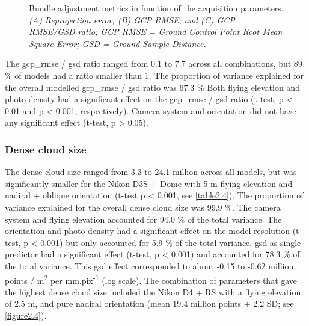 \begin{figure}[ht]
	\caption[Bundle adjustment metrics in function of the acquisition parameters.]{Bundle adjustment metrics in function of the acquisition parameters. \textit{(A) Reprojection error; (B) GCP RMSE; and (C) GCP RMSE/GSD ratio; GCP RMSE = Ground Control Point Root Mean Square Error; GSD = Ground Sample Distance.}}
	\label{figure2.3}
    
\end{figure}

The \acrshort{gcp_rmse} / \acrshort{gsd} ratio ranged from 0.1 to 7.7 across all combinations, but 89 \% of models had a ratio smaller than 1. The proportion of variance explained for the overall modelled \acrshort{gcp_rmse} / \acrshort{gsd} ratio was 67.3 \% Both flying elevation and photo density had a significant effect on the \acrshort{gcp_rmse} / \acrshort{gsd} ratio (t-test, p < 0.01 and p < 0.001, respectively). Camera system and orientation did not have any significant effect (t-test, p > 0.05).
\subsubsection{Dense cloud size}\label{chapitre2_3.1.2}
The dense cloud size ranged from 3.3 to 24.1 million across all models, but was significantly smaller for the Nikon D3S + Dome with 5 m flying elevation and nadiral + oblique orientation (t-test p < 0.001, see \autoref{table2.4}). The proportion of variance explained for the overall dense cloud size was 99.9 \%. The camera system and flying elevation accounted for 94.0 \% of the total variance. The orientation and photo density had a significant effect on the model resolution (t-test, p < 0.001) but only accounted for 5.9 \% of the total variance. \acrshort{gsd} as single predictor had a significant effect (t-test, p < 0.001) and accounted for 78.3 \% of the total variance. This \acrshort{gsd} effect corresponded to about -0.15 to -0.62 million points / m\textsuperscript{2} per mm.pix\textsuperscript{-1} (log scale). The combination of parameters that gave the highest dense cloud size included the Nikon D4 + RS with a flying elevation of 2.5 m, and pure nadiral orientation (mean 19.4 million points $\pm$ 2.2 SD; see \autoref{figure2.4}).

